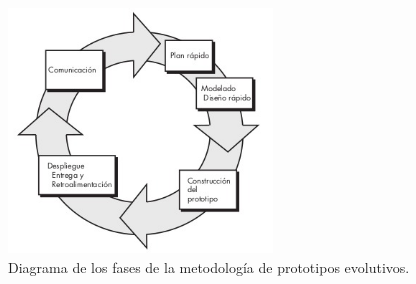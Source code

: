 \documentclass[12pt, a4paper, titlepage]{report}
\begin{document}
    		 \begin{figure}[H]
    			\begin{center}	                      \includegraphics[width=7cm]{./imagenes/Introduccion/Meto_Prototipos.jpeg}
    			\caption[Fases de la metodología por prototipos]{Diagrama de los fases de la metodología de prototipos evolutivos.}
    			\label{fig:metodologia}
    			\end{center}
    		\end{figure}
    		
    		\lipsum[15]
    		
\end{document}

